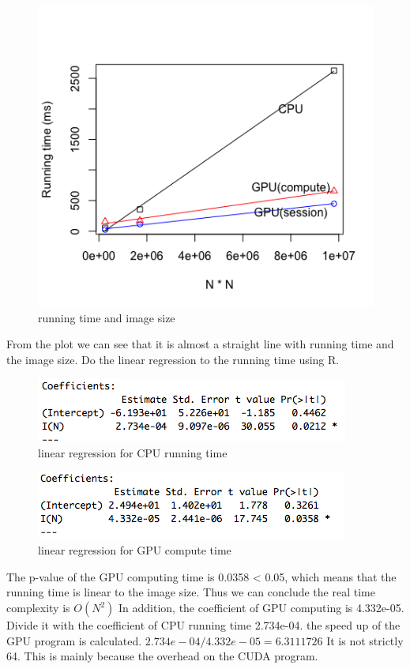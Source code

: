 \documentclass[12pt, a4paper]{article}
\begin{document}
 \begin{figure}[!htbp]
    \includegraphics[scale=0.7]{image/plot1.png}
\caption{running time and image size}
\end{figure}
 
 From the plot we can see that it is almost a straight line with running time and the image size.
 Do the linear regression to the running time using R.
 
  \begin{figure}[!htbp]
    \includegraphics[scale=0.7]{image/regression-1.png}
\caption{linear regression for CPU running time}
\end{figure}

  \begin{figure}[!htbp]
    \includegraphics[scale=0.7]{image/regression-2.png}
\caption{linear regression for GPU compute time}
\end{figure}

 The p-value of the GPU computing time is 0.0358 < 0.05, which means that the running time is linear to 
 the image size. Thus we can conclude the real time complexity is $O(N^2)$
In addition, the coefficient of GPU computing is 4.332e-05. Divide it with the coefficient of CPU running 
time 2.734e-04. the speed up of the GPU program is calculated.
$2.734e-04/4.332e-05 = 6.3111726$ It is not strictly 64. This is mainly because the overhead on the CUDA program.
\end{document}
